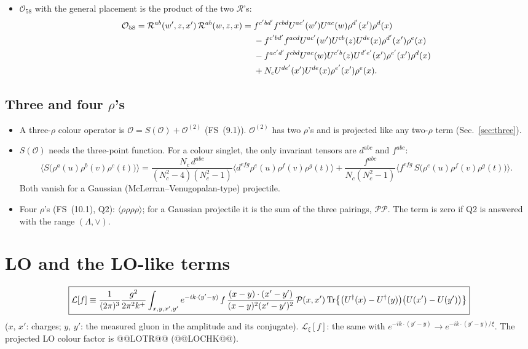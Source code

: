 \documentclass[10pt]{article}
\numberwithin{equation}{section}
\newcommand{\OO}{\mathcal O}
\newcommand{\PP}{\mathcal P}
\newcommand{\LL}{\mathcal L}
\newcommand{\pre}{\frac{1}{(2\pi)^3}}
\begin{document}
\begin{itemize}
\item $\OO_{58}$ with the general placement is the product of the two $\mathcal R$'s:
\begin{align}
\OO_{58}=\mathcal R^{ab}(w',z,x')\,\mathcal R^{ab}(w,z,x)={}&f^{c'bd'}f^{cbd}U^{ac'}(w')U^{ac}(w)\rho^{d'}(x')\rho^d(x)\notag\\
&-f^{c'bd'}f^{acd}U^{ac'}(w')U^{cb}(z)U^{de}(x)\rho^{d'}(x')\rho^e(x)\notag\\
&-f^{ac'd'}f^{cbd}U^{ac}(w)U^{c'b}(z)U^{d'e'}(x')\rho^{e'}(x')\rho^d(x)\notag\\
&+N_cU^{de'}(x')U^{de}(x)\rho^{e'}(x')\rho^e(x).
\label{eq:O58}
\end{align}
\end{itemize}

\subsection{Three and four \texorpdfstring{$\rho$}{rho}'s}
\begin{itemize}
\item A three-$\rho$ colour operator is $\OO=S(\OO)+\OO^{(2)}$ (FS~(9.1)). $\OO^{(2)}$ has two $\rho$'s and is projected like any two-$\rho$ term (Sec.~\ref{sec:three}).
\item $S(\OO)$ needs the three-point function. For a colour singlet, the only invariant tensors are $d^{abc}$ and $f^{abc}$:
\begin{equation}
\langle S\big(\rho^a(u)\rho^b(v)\rho^c(t)\big)\rangle=\frac{N_c\,d^{abc}}{(N_c^2-4)(N_c^2-1)}\langle d^{efg}\rho^e(u)\rho^f(v)\rho^g(t)\rangle+\frac{f^{abc}}{N_c(N_c^2-1)}\langle f^{efg}\,S\big(\rho^e(u)\rho^f(v)\rho^g(t)\big)\rangle.
\end{equation}
Both vanish for a Gaussian (McLerran--Venugopalan-type) projectile.
\item Four $\rho$'s (FS~(10.1), Q2): $\langle\rho\rho\rho\rho\rangle$; for a Gaussian projectile it is the sum of the three pairings, $\PP\PP$. The term is zero if Q2 is answered with the range $(\Lambda,\vee)$.
\end{itemize}

\section{LO and the LO-like terms}\label{sec:LO}
\begin{equation}
\boxed{\LL[f]\equiv\pre\frac{g^2}{2\pi^2k^+}\int_{x,y,x',y'}e^{-ik\cdot(y'-y)}\,f\,\frac{(x-y)\cdot(x'-y')}{(x-y)^2(x'-y')^2}\,\PP(x,x')\,{\rm Tr}\big\{\big(U^\dagger(x)-U^\dagger(y)\big)\big(U(x')-U(y')\big)\big\}}
\label{eq:LO}
\end{equation}
($x$, $x'$: charges; $y$, $y'$: the measured gluon in the amplitude and its conjugate). $\LL_\xi[f]$: the same with $e^{-ik\cdot(y'-y)}\to e^{-ik\cdot(y'-y)/\xi}$. The projected LO colour factor is @@LOTR@@ (@@LOCHK@@).
\end{document}
